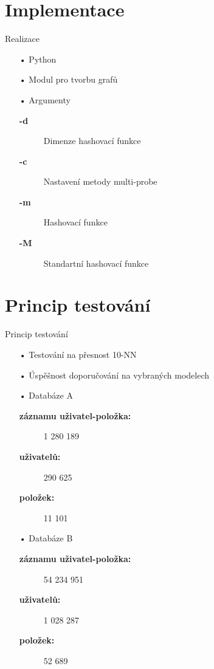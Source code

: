 \documentclass[aspectratio=169,28pt]{beamer}
\begin{document}
\section{Implementace}
\begin{frame}{Realizace}
		\begin{itemize}
		\item[•] Python
		\item[•] Modul pro tvorbu grafů
		\item[•] Argumenty
		       \begin{description}
		       \item[\textbf{-d}] Dimenze hashovací funkce
		       \item[\textbf{-c}] Nastavení metody multi-probe
		       \item[\textbf{-m}] Hashovací funkce
		       \item[\textbf{-M}] Standartní hashovací funkce
		       \end{description}
		\end{itemize}
\end{frame}

\section{Princip testování}
\begin{frame}{Princip testování}
		\begin{itemize}
		\item[•] Testování na přesnost 10-NN
		\item[•] Úspěšnost doporučování na vybraných modelech 
		\item[•] Databáze A
		       \begin{description}
		       \item[\textbf{záznamu uživatel-položka:}] 1 280 189
		       \item[\textbf{uživatelů:}] 290 625
		       \item[\textbf{položek:}] 11 101
		       \end{description}
		\item[•] Databáze B
		       \begin{description}
		       \item[\textbf{záznamu uživatel-položka:}] 54 234 951
		       \item[\textbf{uživatelů:}] 1 028 287
		       \item[\textbf{položek:}] 52 689
		       \end{description}
		\end{itemize}
\end{frame}
\end{document}
